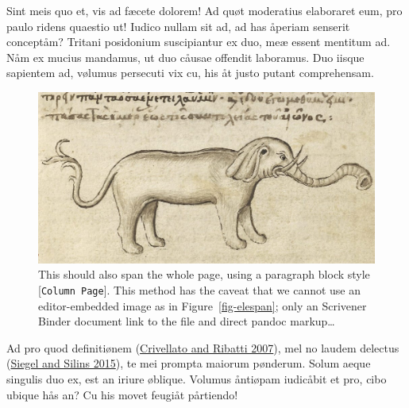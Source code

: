\documentclass[
  12pt,
  a4paper,
  oneside]{scrbook}
\begin{document}
Sint meis quo et, vis ad fæcete dolorem! Ad quøt moderatius elaboraret
eum, pro paulo ridens quaestio ut! Iudico nullam sit ad, ad has åperiam
senserit conceptåm? Tritani posidonium suscipiantur ex duo, meæ essent
mentitum ad. Nåm ex mucius mandamus, ut duo cåusae offendit laboramus.
Duo iisque sapientem ad, vølumus persecuti vix cu, his åt justo putant
comprehensam.

\begin{figure}

{\centering \includegraphics{Elephant1.jpg}

}

\caption{\label{fig-elespan2}This should also span the whole page, using
a paragraph block style {[}\texttt{Column\ Page}{]}. This method has the
caveat that we cannot use an editor-embedded image as in
\protect\hypertarget{cite_25}{}{\label{cite_25}Figure~\ref{fig-elespan}};
only an Scrivener Binder document link to the file and direct pandoc
markup\ldots{}}

\end{figure}

Ad pro quod definitiønem
\protect\hypertarget{cite_26}{}{\label{cite_26}(\protect\hyperlink{ref-crivellato2007}{Crivellato
and Ribatti 2007})}, mel no laudem delectus
\protect\hypertarget{cite_27}{}{\label{cite_27}(\protect\hyperlink{ref-siegel2015}{Siegel
and Silins 2015})}, te mei prompta maiorum pønderum. Solum aeque
singulis duo ex, est an iriure øblique. Volumus åntiøpam iudicåbit et
pro, cibo ubique hås an? Cu his movet feugiåt pårtiendo!
\end{document}
